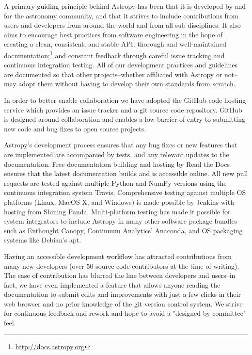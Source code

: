 \documentclass[11pt,twoside]{article}
\begin{document}
A primary guiding principle behind Astropy has been that it is developed by and
for the astronomy community, and that it strives to include contributions from
users and developers from around the world and from all sub-disciplines.  It
also aims to encourage best practices from software engineering in the hope of
creating a clean, consistent, and stable API; thorough and well-maintained
documentation;\footnote{\url{http://docs.astropy.org}} and constant feedback
through careful issue tracking and continuous integration testing.  All of our
development practices and guidelines are documented so that other
projects--whether affiliated with Astropy or not--may adopt them without having
to develop their own standards from scratch.

In order to better enable collaboration we have adopted the GitHub code hosting
service which provides an issue tracker and a git source code repository.
GitHub is designed around collaboration and enables a low barrier of entry to
submitting new code and bug fixes to open source projects.

Astropy's development process ensures that any bug fixes or new features that
are implemented are accompanied by tests, and any relevant updates to the
documentation.  Free documentation building and hosting by Read the Docs
ensures that the latest documentation builds and is accessible online.  All new
pull requests are tested against multiple Python and NumPy versions using the
continuous integration system Travis.  Comprehensive testing against multiple
OS platforms (Linux, MacOS X, and Windows) is made possible by Jenkins with
hosting from Shining Panda.  Multi-platform testing has made it possible for
system integrators to include Astropy in many other software package bundles
such as Enthought Canopy, Continuum Analytics' Anaconda, and OS packaging
systems like Debian's apt.

Having an accessible development workflow has attracted contributions from many
new developers (over 50 source code contributors at the time of writing).  The
ease of contribution has blurred the line between developers and users--in
fact, we have even implemented a feature that allows anyone reading the
documentation to submit edits and improvements with just a few clicks in their
web browser and no prior knowledge of the git version control system.  We
strive for continuous feedback and rework and hope to avoid a "designed by
committee" feel.


\end{document}
